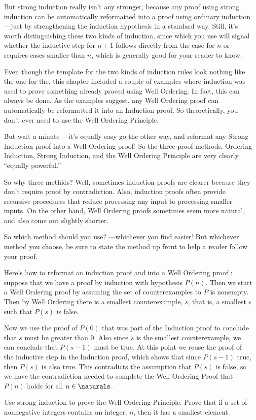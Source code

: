 But strong induction really isn't any stronger, because any proof
using strong induction can be automatically reformatted into a proof
using ordinary induction ---just by strengthening the induction
hypothesis in a standard way.  Still, it's worth distinguishing these
two kinds of induction, since which you use will signal whether the
inductive step for $n+1$ follows directly from the case for $n$ or
requires cases smaller than $n$, which is generally good for your
reader to know.

Even though the template for the two kinds of induction rules look
nothing like the one for the, this
chapter included a couple of examples where induction was used to
prove something already proved using Well Ordering.  In fact, this can
always be done.  As the examples suggest, any Well Ordering proof can
automatically be reformatted it into an Induction proof.  So
theoretically, you don't ever need to use the Well Ordering Principle.

But wait a minute ---it's equally easy go the other way, and reformat
any Strong Induction proof into a Well Ordering proof!  So the three
proof methods, Ordering Induction, Strong Induction, and the Well
Ordering Principle are very clearly ``equally powerful.''

So why three methids?  Well, sometimes induction proofs are clearer
because they don't require proof by contradiction.  Also, induction
proofs often provide recursive procedures that reduce processing any
input to processing smaller inputs.  On the other hand, Well Ordering
proofs sometimes seem more natural, and also come out slightly
shorter.

So which method should you use? ---whichever you find easier!  But
whichever method you choose, be sure to state the method up front to
help a reader follow your proof.

\begin{editingnotes}
Here's how to reformat an induction proof and into a Well
Ordering proof : suppose that we have a proof by induction with
hypothesis $P(n)$.  Then we start a Well Ordering proof by assuming the
set of counterexamples to $P$ is nonempty.  Then by Well Ordering there is
a smallest counterexample, $s$, that is, a smallest $s$ such that $P(s)$
is false.

Now we use the proof of $P(0)$ that was part of the Induction proof to
conclude that $s$ must be greater than 0.  Also since $s$ is the smallest
counterexample, we can conclude that $P(s-1)$ must be true.  At this point
we reuse the proof of the inductive step in the Induction proof, which
shows that since $P(s-1)$ true, then $P(s)$ is also true.  This
contradicts the assumption that $P(s)$ is false, so we have the
contradiction needed to complete the Well Ordering Proof that $P(n)$ holds
for all $n \in \naturals$.

\end{editingnotes}


\begin{editingnotes}
\begin{notesproblem}
Use strong induction to prove the Well Ordering Principle. \hint Prove
that if a set of nonnegative integers contains an integer, $n$, then it
has a smallest element.
\end{notesproblem}
\end{editingnotes}

\endinput
